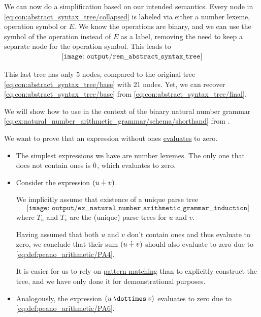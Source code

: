 \begin{concept}
  We can now do a simplification based on our intended semantics. Every node in \eqref{eq:con:abstract_syntax_tree/collapsed} is labeled via either a number lexeme, operation symbol or \( E \). We know the operations are binary, and we can use the symbol of the operation instead of \( E \) as a label, removing the need to keep a separate node for the operation symbol. This leads to
  \begin{equation}\label{eq:con:abstract_syntax_tree/final}
    \begin{aligned}
      \texttt{[image: output/rem\_\_abstract\_syntax\_tree]}
    \end{aligned}
  \end{equation}

  This last tree has only 5 nodes, compared to the original tree \eqref{eq:con:abstract_syntax_tree/base} with 21 nodes. Yet, we can recover \eqref{eq:con:abstract_syntax_tree/base} from \eqref{eq:con:abstract_syntax_tree/final}.
\end{concept}

\begin{example}\label{ex:natural_number_arithmetic_grammar/induction}
  We will show how to use  in the context of the binary natural number grammar \eqref{eq:ex:natural_number_arithmetic_grammar/schema/shorthand} from .

  We want to prove that an expression without ones \hyperref[con:evaluation]{evaluates} to zero.

  \begin{itemize}
    \item The simplest expressions we have are number \hyperref[con:abstract_syntax_tree/lexical]{lexemes}. The only one that does not contain ones is \( \dot{0} \), which evaluates to zero.

    \item Consider the expression \( (u \mathbin{\dotplus} v) \).

    We implicitly assume that existence of a unique parse tree
    \begin{equation*}
      \texttt{[image: output/ex\_\_natural\_number\_arithmetic\_grammar\_\_induction]}
    \end{equation*}
    where \( T_u \) and \( T_v \) are the (unique) parse trees for \( u \) and \( v \).

    Having assumed that both \( u \) and \( v \) don't contain ones and thus evaluate to zero, we conclude that their sum \( (u \mathbin{\dotplus} v) \) should also evaluate to zero due to \ref{eq:def:peano_arithmetic/PA4}.

    It is easier for us to rely on \hyperref[con:evaluation]{pattern matching} than to explicitly construct the tree, and we have only done it for demonstrational purposes.

    \item Analogously, the expression \( (u \syntimes v) \) evaluates to zero due to \ref{eq:def:peano_arithmetic/PA6}.
  \end{itemize}
\end{example}
